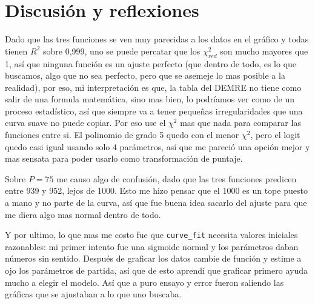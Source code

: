 \documentclass[10pt,a4paper]{article}
\begin{document}
\section{Discusión y reflexiones}
Dado que las tres funciones se ven muy parecidas a los datos en el gráfico y todas tienen $R^2$ sobre 0,999, uno se puede percatar que los $\chi^2_{red}$ son mucho mayores que 1, así que ninguna función es un ajuste perfecto (que dentro de todo, es lo que buscamos, algo que no sea perfecto, pero que se asemeje lo mas posible a la realidad), por eso, mi interpretación es que, la tabla del DEMRE no tiene como salir de una formula matemática, sino mas bien, lo podríamos ver como de un proceso estadístico, así que siempre va a tener pequeñas irregularidades que una curva suave no puede copiar. Por eso use el $\chi^2$ mas que nada para comparar las funciones entre si. El polinomio de grado 5 quedo con el menor $\chi^2$, pero el logit quedo casi igual usando solo 4 parámetros, así que me pareció una opción mejor y mas sensata para poder usarlo como transformación de puntaje.

Sobre $P=75$ me causo algo de confusión, dado que las tres funciones predicen entre 939 y 952, lejos de 1000. Esto me hizo pensar que el 1000 es un tope puesto a mano y no parte de la curva, así que fue buena idea sacarlo del ajuste para que me diera algo mas normal dentro de todo.

Y por ultimo, lo que mas me costo fue que \texttt{curve\_fit} necesita valores iniciales razonables: mi primer intento fue una sigmoide normal y los parámetros daban números sin sentido. Después de graficar los datos cambie de función y estime a ojo los parámetros de partida, así que de esto aprendí que graficar primero ayuda mucho a elegir el modelo. Así que a puro ensayo y error fueron saliendo las gráficas que se ajustaban a lo que uno buscaba.


\end{document}
